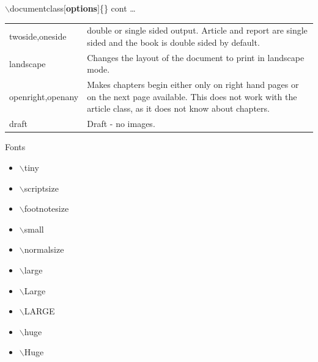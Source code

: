 \documentclass[10pt,times]{beamer}
\begin{document}

\begin{frame}{$\backslash$documentclass$[$\textbf{options}$]$\{\} cont \dots}
\begin{table}
\begin{tabular}{|p{}|p{}|}
twoside,\newline  oneside & double or single sided output. Article and report are single sided and the book is double sided by default. \\
landscape & Changes the layout of the document to print in landscape mode. \\
openright,\newline  openany & Makes chapters begin either only on right hand pages or on the next page available. This does not work with the article class, as it does not know about chapters. \\
draft & Draft - no images. \\
\end{tabular}
\end{table}
\end{frame}


\begin{frame}{Fonts}
\begin{itemize}
\item \tiny $\backslash$tiny
\item \scriptsize $\backslash$scriptsize
\item \footnotesize $\backslash$footnotesize
\item \small $\backslash$small
\item \normalsize $\backslash$normalsize
\item \large $\backslash$large
\item \Large $\backslash$Large
\item \LARGE $\backslash$LARGE
\item \huge $\backslash$huge
\item \Huge $\backslash$Huge
\end{itemize}
\end{frame}


\end{document}
